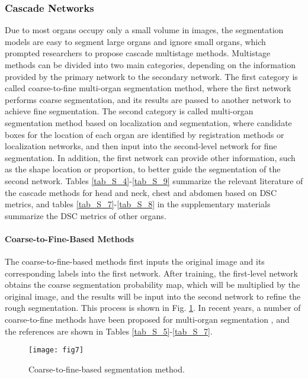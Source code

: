\documentclass[lettersize,journal]{IEEEtran}
\begin{document}
\subsubsection{Cascade Networks}
Due to most organs occupy only a small volume in images, the segmentation models are easy to segment large organs and ignore small organs, which prompted researchers to propose cascade multistage methods. Multistage methods can be divided into two main categories, depending on the information provided by the primary network to the secondary network. The first category is called coarse-to-fine multi-organ segmentation method, where the first network performs coarse segmentation, and its results are passed to another network to achieve fine segmentation. The second category is called multi-organ segmentation method based on localization and segmentation, where candidate boxes for the location of each organ are identified by registration methods or localization networks, and then input into the second-level network for fine segmentation. In addition, the first network can provide other information, such as the shape location or proportion, to better guide the segmentation of the second network. Tables \ref{tab_S_4}-\ref{tab_S_9} summarize the relevant literature of the cascade methods for head and neck, chest and abdomen based on DSC metrics, and tables \ref{tab_S_7}-\ref{tab_S_8} in the supplementary materials summarize the DSC metrics of other organs.

\paragraph{Coarse-to-Fine-Based Methods}
The coarse-to-fine-based methods first inputs the original image and its corresponding labels into the first network. After training, the first-level network obtains the coarse segmentation probability map, which will be multiplied by the original image, and the results will be input into the second network to refine the rough segmentation. This process is shown in Fig. \ref{fig7}. In recent years, a number of coarse-to-fine methods have been proposed for multi-organ segmentation \cite{123,124,125,126,129,130,133,152,153,154}, and the references are shown in Tables \ref{tab_S_5}-\ref{tab_S_7}.
\begin{figure}[ht!]
    \centering
    \texttt{[image: fig7]}
    \caption{Coarse-to-fine-based segmentation method.}
    \label{fig7}
\end{figure}
\end{document}
